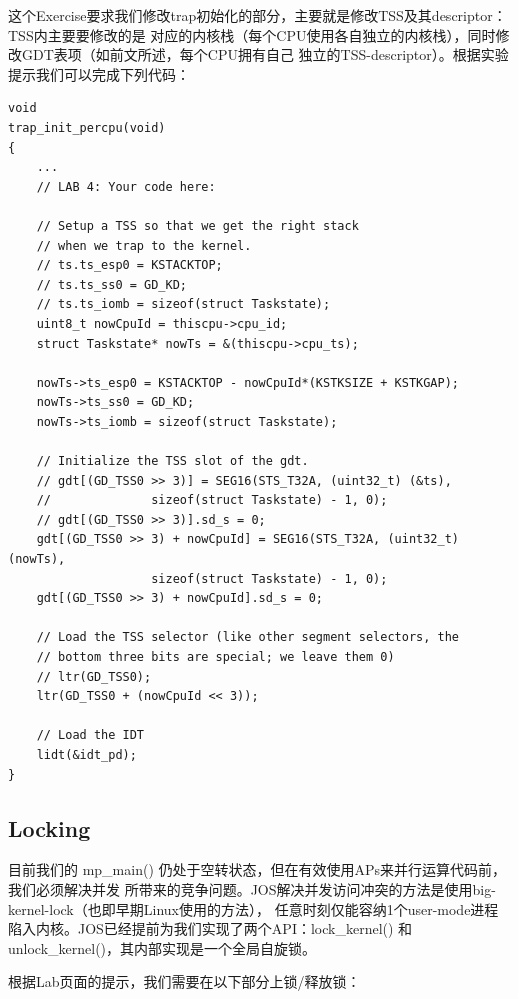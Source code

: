 \documentclass[12pt, letterpaper]{report}
\begin{document}
这个Exercise要求我们修改trap初始化的部分，主要就是修改TSS及其descriptor：TSS内主要要修改的是
对应的内核栈（每个CPU使用各自独立的内核栈），同时修改GDT表项（如前文所述，每个CPU拥有自己
独立的TSS-descriptor）。根据实验提示我们可以完成下列代码：\par 
\newpage
\lstset{style=CStyle}
\setmainfont{Consolas}
\begin{lstlisting}
void
trap_init_percpu(void)
{
    ...
    // LAB 4: Your code here:

    // Setup a TSS so that we get the right stack
    // when we trap to the kernel.
    // ts.ts_esp0 = KSTACKTOP;
    // ts.ts_ss0 = GD_KD;
    // ts.ts_iomb = sizeof(struct Taskstate);
    uint8_t nowCpuId = thiscpu->cpu_id;
    struct Taskstate* nowTs = &(thiscpu->cpu_ts);

    nowTs->ts_esp0 = KSTACKTOP - nowCpuId*(KSTKSIZE + KSTKGAP);
    nowTs->ts_ss0 = GD_KD;
    nowTs->ts_iomb = sizeof(struct Taskstate);

    // Initialize the TSS slot of the gdt.
    // gdt[(GD_TSS0 >> 3)] = SEG16(STS_T32A, (uint32_t) (&ts),
    // 				sizeof(struct Taskstate) - 1, 0);
    // gdt[(GD_TSS0 >> 3)].sd_s = 0;
    gdt[(GD_TSS0 >> 3) + nowCpuId] = SEG16(STS_T32A, (uint32_t) (nowTs),
                    sizeof(struct Taskstate) - 1, 0);
    gdt[(GD_TSS0 >> 3) + nowCpuId].sd_s = 0;

    // Load the TSS selector (like other segment selectors, the
    // bottom three bits are special; we leave them 0)
    // ltr(GD_TSS0);
    ltr(GD_TSS0 + (nowCpuId << 3));

    // Load the IDT
    lidt(&idt_pd);
}
\end{lstlisting}
\setmainfont{Times New Roman}

\newpage
\subsection{Locking}
目前我们的 mp\_main() 仍处于空转状态，但在有效使用APs来并行运算代码前，我们必须解决并发
所带来的竞争问题。JOS解决并发访问冲突的方法是使用big-kernel-lock（也即早期Linux使用的方法），
任意时刻仅能容纳1个user-mode进程陷入内核。JOS已经提前为我们实现了两个API：lock\_kernel() 和
unlock\_kernel()，其内部实现是一个全局自旋锁。\par 
根据Lab页面的提示，我们需要在以下部分上锁/释放锁：\par 
\end{document}
